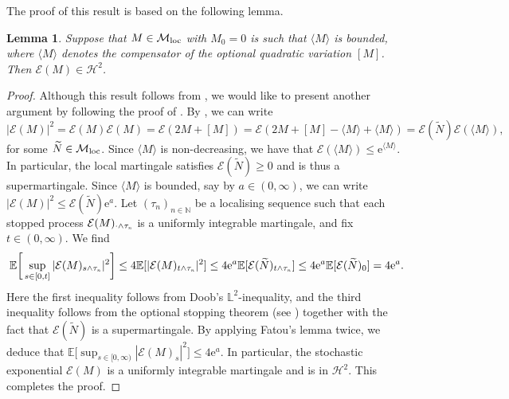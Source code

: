 \documentclass[10pt]{article} %
\newtheorem{lemma}[theorem]{Lemma}
\newcommand\cE{\mathcal E}
\newcommand\cH{\mathcal H}
\newcommand\cM{\mathcal M}
\newcommand{\smalltext}[1]{\text{\fontsize{4}{4}\selectfont$#1$}}
\def \E{\mathbb{E}}
\def \L{\mathbb{L}}
\def \N{\mathbb{N}}
\newcommand{\1}{\mathbf{1}}
\begin{document}
The proof of this result is based on the following lemma.

\begin{lemma}\label{lem::stoch_exp}
	Suppose that $M \in \cM_\text{\rm loc}$ with $M_0 = 0$ is such that $\langle M \rangle$ is bounded, where $\langle M \rangle$ denotes the compensator of the optional quadratic variation $[M]$. Then $\cE(M) \in \cH^2$.
\end{lemma}

\begin{proof}
	Although this result follows from \cite[Proposition 8.27]{jacod1979calcul}, we would like to present another argument by following the proof of \cite[Th\'eor\`eme II.3]{lepingle1978sur}. By \cite[Proposition II.1]{lepingle1978sur2}, we can write
	\begin{equation*}
		|\cE(M)|^2 = \cE(M)\cE(M) = \cE(2M + [M]) = \cE(2M + [M] - \langle M \rangle + \langle M \rangle) = \cE(\widetilde N) \cE(\langle M \rangle),
	\end{equation*}
	for some $\widetilde N \in \cM_\text{\rm loc}$. Since $\langle M \rangle$ is non-decreasing, we have that $\cE(\langle M \rangle) \leq \mathrm{e}^{\langle M \rangle}$. In particular, the local martingale satisfies $\cE(\widetilde N) \geq 0$ and is thus a supermartingale. Since $\langle M \rangle$ is bounded, say by $a \in (0,\infty)$, we can write $|\cE(M)|^2 \leq \cE(\widetilde N) \mathrm{e}^a$. Let $(\tau_n)_{n \in \N}$ be a localising sequence such that each stopped process $\cE(M)_{\cdot \land \tau_\smalltext{n}}$ is a uniformly integrable martingale, and fix $t \in (0,\infty)$. We find
	\begin{equation*}
		\E\bigg[\sup_{s \in [0,t]} |\cE(M)_{s \land \tau_\smalltext{n}}|^2\bigg] \leq 4 \E[|\cE(M)_{t \land \tau_\smalltext{n}}|^2] \leq 4 \mathrm{e}^a \E[\cE(\widetilde N)_{t \land \tau_\smalltext{n}}] \leq 4 \mathrm{e}^a\E[\cE(\widetilde N)_0] = 4 \mathrm{e}^a.
	\end{equation*}
	Here the first inequality follows from Doob's $\L^2$-inequality, and the third inequality follows from the optional stopping theorem (see \cite[Theorem 3.2.7]{weizsaecker1990stochastic}) together with the fact that $\cE(\widetilde N)$ is a supermartingale. By applying Fatou's lemma twice, we deduce that $\E\big[\sup_{s \in [0,\infty)} |\cE(M)_s|^2\big] \leq 4 \mathrm{e}^a.$ In particular, the stochastic exponential $\cE(M)$ is a uniformly integrable martingale and is in $\cH^2$. This completes the proof.
	\end{proof}
\end{document}
